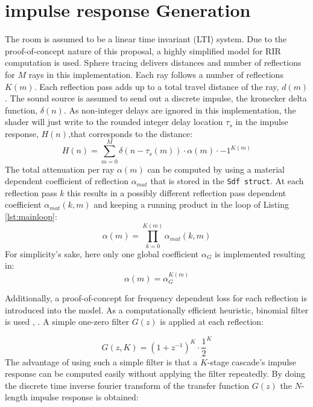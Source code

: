 \documentclass[twoside,a4paper]{article}
\begin{document}
\section{impulse response Generation}
The room is assumed to be a linear time invariant (LTI) system. Due to the proof-of-concept nature of this proposal, a highly simplified model for RIR computation is used. Sphere tracing delivers distances and number of reflections for $M$ rays in this implementation. Each ray follows a number of reflections $K(m)$. Each reflection pass adds up to a total travel distance of the ray, $d(m)$. The sound source is assumed to send out a discrete impulse, the kronecker delta function, $\delta(n)$. As non-integer delays are ignored in this implementation, the shader will just write to the rounded integer delay location $\tau_s$ in the impulse response, $H(n)$,that corresponds to the distance:
\begin{equation}
H(n) = \sum_{m=0}^M \delta(n-\tau_s(m))\cdot \alpha(m)\cdot -1^{K(m)}
\end{equation}
The total attenuation per ray $\alpha(m)$ can be computed by using a material dependent coefficient of reflection $\alpha_{mat}$ that is stored in the \texttt{Sdf struct}. At each reflection pass $k$ this results in a possibly different reflection pass dependent coefficient $\alpha_{mat}(k,m)$ and keeping a running product in the loop of Listing \ref{lst:mainloop}:
\begin{equation}
\alpha(m)=\prod_{k=0}^{K(m)} \alpha_{mat}(k,m)
\end{equation}
For simplicity's sake, here only one global coefficient $\alpha_G$ is implemented resulting in:
\begin{equation}
\alpha(m) = \alpha_G^{K(m)}
\end{equation}

Additionally, a proof-of-concept for frequency dependent loss for each reflection is introduced into the model. As a computationally efficient heuristic, binomial filter is used \cite{aubury_binomial_1996}, \cite{derpanis_overview_nodate}. A simple one-zero filter $G(z)$ is applied at each reflection:

\begin{equation}
G(z,K) = (1+z^{-1})^K \cdot \frac{1}{2}^K
\end{equation}
The advantage of using such a simple filter is that a $K$-stage cascade's impulse response can be computed easily without applying the filter repeatedly. By doing the discrete time inverse fourier transform of the transfer function $G(z)$ the $N$-length impulse response is obtained:
\end{document}
